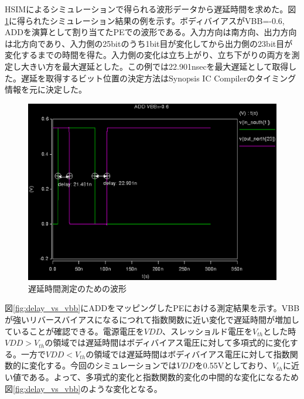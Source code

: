 {HSIMによるシミュレーションで得られる波形データから遅延時間を求めた。図\ref{fig:delay_wave}に得られたシミュレーション結果の例を示す。ボディバイアスがVBB=-0.6, ADDを演算として割り当てたPEでの波形である。入力方向は南方向、出力方向は北方向であり、入力側の25bitのうち1bit目が変化してから出力側の23bit目が変化するまでの時間を得た。入力側の変化は立ち上がり、立ち下がりの両方を測定し大きい方を最大遅延とした。この例では22.901nsecを最大遅延として取得した。遅延を取得するビット位置の決定方法はSynopsis IC Compilerのタイミング情報を元に決定した。

\begin{figure}[h]
\centering
\includegraphics[width=12cm]{./chap6/fig/delay_wave.eps}
\caption{遅延時間測定のための波形}
\label{fig:delay_wave}
\end{figure}

図\ref{fig:delay_vs_vbb}にADDをマッピングしたPEにおける測定結果を示す。VBBが強いリバースバイアスになるにつれて指数関数に近い変化で遅延時間が増加していることが確認できる。電源電圧を$VDD$、スレッショルド電圧を$V_{th}$とした時$VDD > V_{th}$の領域では遅延時間はボディバイアス電圧に対して多項式的に変化する。一方で$VDD < V_{th}$の領域では遅延時間はボディバイアス電圧に対して指数関数的に変化する。\cite{west}今回のシミュレーションでは$VDD$を0.55Vとしており、$V_{th}$に近い値である。よって、多項式的変化と指数関数的変化の中間的な変化になるため図\ref{fig:delay_vs_vbb}のような変化となる。

}
